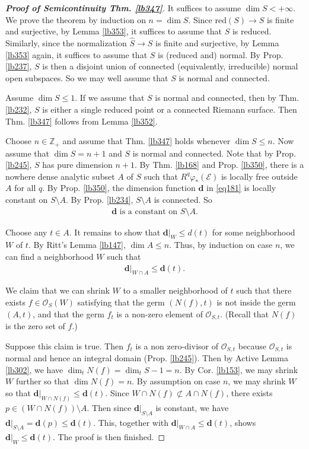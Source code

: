 \documentclass[12pt,b5paper,notitlepage]{report}
\theoremstyle{definition}
\theoremstyle{plain}
\newcommand{\wht}{\widehat}
\newcommand{\scr}{\mathscr}
\newcommand{\mbf}{\mathbf}
\newcommand{\Zbb}{\mathbb Z}
\newcommand{\red}{\mathrm{red}}
\numberwithin{equation}{section}
\begin{document}
\begin{proof}[\textbf{Proof of Semicontinuity Thm. \ref{lb347}}]
It suffices to assume $\dim S<+\infty$. We prove the theorem by induction on $n=\dim S$. Since $\red(S)\rightarrow S$ is finite and surjective, by Lemma \ref{lb353}, it suffices to assume that $S$ is reduced. Similarly, since the normalization $\wht S\rightarrow S$ is finite and surjective, by Lemma \ref{lb353} again, it suffices to assume that $S$ is (reduced and) normal. By Prop. \ref{lb237}, $S$ is then a disjoint union of connected (equivalently, irreducible) normal open subspaces. So we may well assume that $S$ is normal and connected.

Assume $\dim S\leq 1$. If we assume that $S$ is normal and connected, then by Thm. \ref{lb232}, $S$ is either a single reduced point or a connected Riemann surface. Then Thm. \ref{lb347} follows from Lemma \ref{lb352}.

Choose $n\in\Zbb_+$ and assume that Thm. \ref{lb347} holds whenever $\dim S\leq n$. Now assume that $\dim S=n+1$ and $S$ is normal and connected. Note that by Prop. \ref{lb245}, $S$ has pure dimension $n+1$. By Thm. \ref{lb168} and Prop. \ref{lb350}, there is a nowhere dense analytic subset $A$ of $S$ such that $R^q\varphi_*(\scr E)$ is locally free outside $A$ for all $q$. By Prop. \ref{lb350}, the dimension function $\mbf d$ in \eqref{eq181} is locally constant on $S\setminus A$. By Prop. \ref{lb234}, $S\setminus A$ is connected. So 
\begin{align*}
\mbf d\text{ is a constant on }S\setminus A.
\end{align*}


Choose any $t\in A$. It remains to show that $\mbf d|_W\leq d(t)$ for some neighborhood $W$ of $t$. By Ritt's Lemma \ref{lb147}, $\dim A\leq n$. Thus, by induction on case $n$, we can find a neighborhood $W$ such that
\begin{align*}
\mbf d|_{W\cap A}\leq \mbf d(t).
\end{align*}

We claim that we can shrink $W$ to a smaller neighborhood of $t$ such that there exists $f\in\scr O_S(W)$ satisfying that the germ $(N(f),t)$ is not inside the germ $(A,t)$, and that the germ $f_t$ is a non-zero element of $\scr O_{S,t}$. (Recall that $N(f)$ is the zero set of $f$.) 

Suppose this claim is true. Then $f_t$ is a non zero-divisor of $\scr O_{S,t}$ because $\scr O_{S,t}$ is normal and hence an integral domain (Prop. \ref{lb245}). Then by Active Lemma \ref{lb302}, we have $\dim_t N(f)=\dim_t S-1=n$.  By Cor. \ref{lb153}, we may shrink $W$ further so that $\dim N(f)=n$.  By assumption on case $n$, we may shrink $W$ so that $\mbf d|_{W\cap N(f)}\leq \mbf d(t)$. Since $W\cap N(f)\nsubset A\cap N(f)$, there exists $p\in (W\cap N(f))\setminus A$. Then since $\mbf d|_{S\setminus A}$ is constant, we have $\mbf d|_{S\setminus A}=\mbf d(p)\leq \mbf d(t)$. This, together with $\mbf d|_{W\cap A}\leq \mbf d(t)$, shows $\mbf d|_W\leq\mbf d(t)$. The proof is then finished.




\end{proof}
\end{document}
